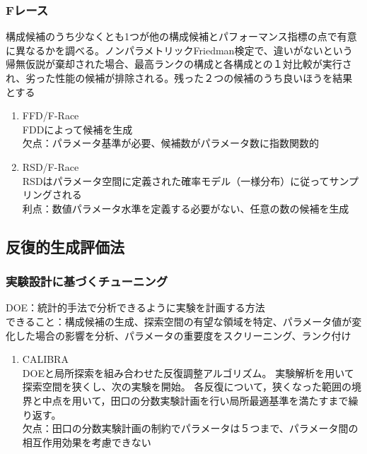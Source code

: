\documentclass[twocolumn]{jarticle}     %
\begin{document}
\subsubsection{Fレース}
構成候補のうち少なくとも1つが他の構成候補とパフォーマンス指標の点で有意に異なるかを調べる。ノンパラメトリックFriedman検定で、違いがないという帰無仮説が棄却された場合、最高ランクの構成と各構成との１対比較が実行され、劣った性能の候補が排除される。残った２つの候補のうち良いほうを結果とする

\begin{enumerate}
  \item FFD/F-Race \\
  FDDによって候補を生成\\
  欠点：パラメータ基準が必要、候補数がパラメータ数に指数関数的

  \item RSD/F-Race \\
  RSDはパラメータ空間に定義された確率モデル（一様分布）に従ってサンプリングされる\\
  利点：数値パラメータ水準を定義する必要がない、任意の数の候補を生成
\end{enumerate}

\subsection{反復的生成評価法}

\subsubsection{実験設計に基づくチューニング}
DOE：統計的手法で分析できるように実験を計画する方法\\
できること：構成候補の生成、探索空間の有望な領域を特定、パラメータ値が変化した場合の影響を分析、パラメータの重要度をスクリーニング、ランク付け

\begin{enumerate}
  \item CALIBRA \\
  DOEと局所探索を組み合わせた反復調整アルゴリズム。
  実験解析を用いて探索空間を狭くし、次の実験を開始。
  各反復について，狭くなった範囲の境界と中点を用いて，田口の分数実験計画を行い局所最適基準を満たすまで繰り返す。\\
  欠点：田口の分数実験計画の制約でパラメータは５つまで、パラメータ間の相互作用効果を考慮できない

\end{enumerate}
\end{document}
